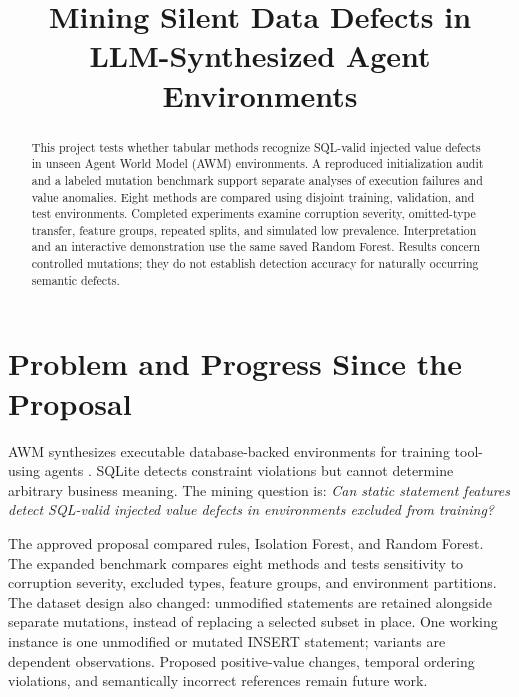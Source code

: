 \documentclass[conference]{IEEEtran}
\begin{document}
\title{Mining Silent Data Defects in LLM-Synthesized Agent Environments}
\author{
}
\maketitle

\begin{abstract}
This project tests whether tabular methods recognize SQL-valid injected value defects in unseen Agent World Model (AWM) environments. A reproduced initialization audit and a labeled mutation benchmark support separate analyses of execution failures and value anomalies. Eight methods are compared using disjoint training, validation, and test environments. Completed experiments examine corruption severity, omitted-type transfer, feature groups, repeated splits, and simulated low prevalence. Interpretation and an interactive demonstration use the same saved Random Forest. Results concern controlled mutations; they do not establish detection accuracy for naturally occurring semantic defects.
\end{abstract}

\section{Problem and Progress Since the Proposal}
AWM synthesizes executable database-backed environments for training tool-using agents \cite{wang2026awm}. SQLite detects constraint violations but cannot determine arbitrary business meaning. The mining question is: \emph{Can static statement features detect SQL-valid injected value defects in environments excluded from training?}

The approved proposal compared rules, Isolation Forest, and Random Forest. The expanded benchmark compares eight methods and tests sensitivity to corruption severity, excluded types, feature groups, and environment partitions. The dataset design also changed: unmodified statements are retained alongside separate mutations, instead of replacing a selected subset in place. One working instance is one unmodified or mutated INSERT statement; variants are dependent observations. Proposed positive-value changes, temporal ordering violations, and semantically incorrect references remain future work.
\end{document}
